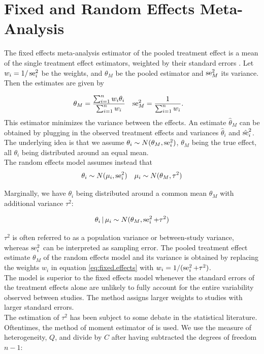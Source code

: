 \documentclass[11pt,a4paper,twoside]{book}\usepackage[]{graphicx}\usepackage[]{color}
\begin{document}
\section{Fixed and Random Effects Meta-Analysis} \label{sec:meta.analysis}
The fixed effects meta-analysis estimator of the pooled treatment effect is a mean of the single treatment effect estimators, weighted by their standard errors \citep{fixed.effects.rosenthal}. Let $w_i = 1/\operatorname{se}_i^2$ be the weights, and $\theta_M$ be the pooled estimator and $\operatorname{se}_M^2$ its variance. Then the estimates are given by

\begin{align}
\theta_M &= \frac{\sum_{i = 1}^n w_i \theta_i}{\sum_{i = 1}^n w_i} &
\operatorname{se}_M^2 &= \frac{1}{\sum_{i = 1}^n w_i}. \label{eq:fixed.effects}
\end{align}
This estimator minimizes the variance between the effects. An estimate $\hat{\theta}_M$ can be obtained by plugging in the observed treatment effects and variances $\hat{\theta}_i$ and $\hat{\operatorname{se}}_i^2$. The underlying idea is that we assume $\theta_i \sim N(\theta_M, \operatorname{se}_i^2)$, $\theta_M$ being the true effect, all $\theta_i$ being distributed around an equal mean.\\
The random effects model \citep{whitehead} assumes instead that 
\begin{align}
\theta_i \sim N(\mu_i, \operatorname{se}_i^2) &&
\mu_i \sim N(\theta_M, \tau^2) \label{eq:random.effects} 
\end{align}

Marginally, we have $\theta_i$ being distributed around a common mean $\theta_M$ with additional variance $\tau^2$:

\begin{align}
\theta_i \given \mu_i \sim N(\theta_M, \se_i^2 + \tau^2) \nonumber %
\end{align}

$\tau^2$ is often referred to as a population variance or between-study variance, whereas $\operatorname{se}_i^2$ can be interpreted as sampling error. The pooled treatment effect estimate $\theta_M$ of the random effects model and its variance is obtained by replacing the weights $w_i$ in equation \eqref{eq:fixed.effects} with $w_i = 1/(\operatorname{se}_i^2 + \tau^2)$.\\
The model is superior to the fixed effects model whenever the standard errors of the treatment effects alone are unlikely to fully account for the entire variability observed between studies. The method assigns larger weights to studies with larger standard errors.\\
The estimation of $\tau^2$ has been subject to some debate in the statistical literature. Oftentimes, the method of moment estimator of \citet{tau.estimator} is used. We use the measure of heterogeneity, $Q$, and divide by $C$ after having subtracted the degrees of freedom $n-1$:
\end{document}
